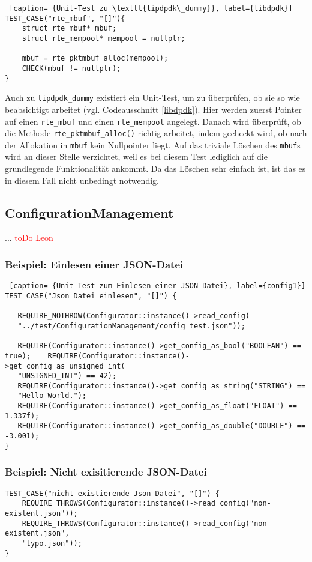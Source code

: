 \documentclass[../review_3.tex]{subfiles}
\begin{document}
\begin{lstlisting} [caption= {Unit-Test zu \texttt{lipdpdk\_dummy}}, label={libdpdk}]
TEST_CASE("rte_mbuf", "[]"){
    struct rte_mbuf* mbuf;
    struct rte_mempool* mempool = nullptr;
    
    mbuf = rte_pktmbuf_alloc(mempool);
    CHECK(mbuf != nullptr);
}
\end{lstlisting}

Auch zu \texttt{lipdpdk\_dummy} existiert ein Unit-Test, um zu überprüfen, ob sie so wie beabsichtigt arbeitet (vgl. Codeausschnitt \ref{libdpdk}). Hier werden zuerst Pointer auf einen \texttt{rte\_mbuf} und einen \texttt{rte\_mempool} angelegt. Danach wird überprüft, ob die Methode \texttt{rte\_pktmbuf\_alloc()} richtig arbeitet, indem gecheckt wird, ob nach der Allokation in \texttt{mbuf} kein Nullpointer liegt. Auf das triviale Löschen des \texttt{mbuf}s wird an dieser Stelle verzichtet, weil es bei diesem Test lediglich auf die grundlegende Funktionalität ankommt. Da das Löschen sehr einfach ist, ist das es in diesem Fall nicht unbedingt notwendig.

\subsection{ConfigurationManagement}
... %
\textcolor{red}{toDo Leon}

\subsubsection{Beispiel: Einlesen einer JSON-Datei}
\begin{lstlisting} [caption= {Unit-Test zum Einlesen einer JSON-Datei}, label={config1}]
TEST_CASE("Json Datei einlesen", "[]") {
    
   REQUIRE_NOTHROW(Configurator::instance()->read_config(
   "../test/ConfigurationManagement/config_test.json"));
    
   REQUIRE(Configurator::instance()->get_config_as_bool("BOOLEAN") == true);    REQUIRE(Configurator::instance()->get_config_as_unsigned_int(
   "UNSIGNED_INT") == 42);
   REQUIRE(Configurator::instance()->get_config_as_string("STRING") ==
   "Hello World.");
   REQUIRE(Configurator::instance()->get_config_as_float("FLOAT") == 1.337f);
   REQUIRE(Configurator::instance()->get_config_as_double("DOUBLE") == -3.001);
} \end{lstlisting}
\subsubsection{Beispiel: Nicht exisitierende JSON-Datei}
\begin{lstlisting}[caption= {Unit Test: Nicht existierende JSON-Datei}, label={config2}]
TEST_CASE("nicht existierende Json-Datei", "[]") {
    REQUIRE_THROWS(Configurator::instance()->read_config("non-existent.json"));
    REQUIRE_THROWS(Configurator::instance()->read_config("non-existent.json",
    "typo.json"));
}\end{lstlisting}
\end{document}
